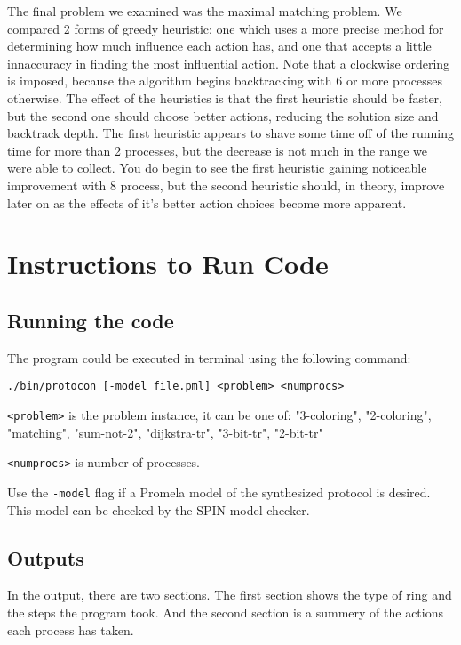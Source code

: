 The final problem we examined was the maximal matching problem.  We compared 2 forms of greedy heuristic:
one which uses a more precise method for determining how much influence each action has, and one that
accepts a little innaccuracy in finding the most influential action.  Note that a clockwise ordering is
imposed, because the algorithm begins backtracking with 6 or more processes otherwise.  The effect of the
heuristics is that the first heuristic should be faster, but the second one should choose better
actions, reducing the solution size and backtrack depth.  The first heuristic appears to shave some time
off of the running time for more than 2 processes, but the decrease is not much in the range we were able
to collect.  You do begin to see the first heuristic gaining noticeable improvement with 8 process, but
the second heuristic should, in theory, improve later on as the effects of it's better action choices
become more apparent.

\section{Instructions to Run Code}
\subsection{Running the code}
The program could be executed in terminal using the following command:

\begin{center}
\texttt{./bin/protocon [-model file.pml] <problem> <numprocs>}
\end{center}

\texttt{<problem>} is the problem instance, it can be one of:
"3-coloring", "2-coloring", "matching", "sum-not-2", "dijkstra-tr", "3-bit-tr", "2-bit-tr"

\texttt{<numprocs>} is number of processes.

Use the \texttt{-model} flag if a Promela model of the synthesized protocol is desired.
This model can be checked by the SPIN model checker.

\subsection{Outputs}
In the output, there are two sections. The first section shows the type of ring and the steps the program took. And the second section is a summery of the actions each process has taken.

